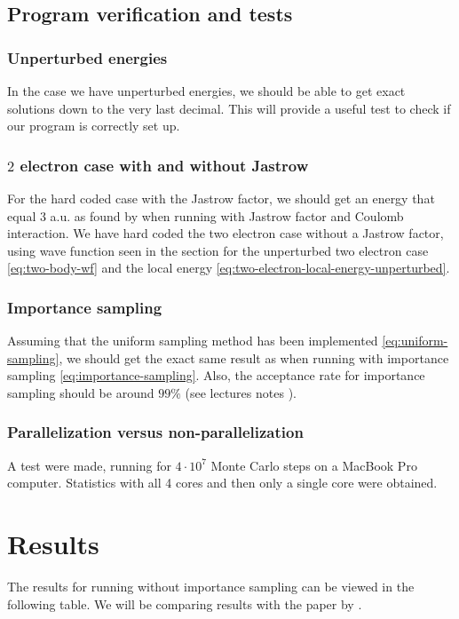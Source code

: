 \documentclass[11pt]{article}
\begin{document}
\subsection{Program verification and tests}
\subsubsection{Unperturbed energies}
In the case we have unperturbed energies, we should be able to get exact solutions down to the very last decimal. This will provide a useful test to check if our program is correctly set up.

\subsubsection{\texorpdfstring{$2$}{a} electron case with and without Jastrow}
For the hard coded case with the Jastrow factor, we should get an energy that equal 3 a.u. as found by \citet{PhysRevA.48.3561} when running with Jastrow factor and Coulomb interaction. We have hard coded the two electron case without a Jastrow factor, using wave function seen in the section for the unperturbed two electron case \eqref{eq:two-body-wf} and the local energy \eqref{eq:two-electron-local-energy-unperturbed}.

\subsubsection{Importance sampling}
Assuming that the uniform sampling method has been implemented \eqref{eq:uniform-sampling}, we should get the exact same result as when running with importance sampling \eqref{eq:importance-sampling}. Also, the acceptance rate for importance sampling should be around $99\%$ (see lectures notes \cite{komp2015}).

\subsubsection{Parallelization versus non-parallelization}
A test were made, running for $4\cdot 10^7$ Monte Carlo steps on a MacBook Pro computer. Statistics with all 4 cores and then only a single core were obtained.





\section{Results}
The results for running without importance sampling can be viewed in the following table. We will be comparing results with the paper by \citet{PhysRevB.84.115302}.
\end{document}
